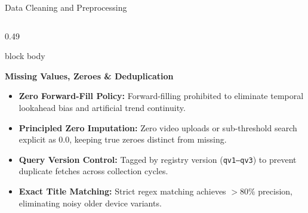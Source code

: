 \documentclass[aspectratio=169, 10pt]{beamer}
\newenvironment{card}[1][]{%
    \begin{beamercolorbox}[rounded=true,shadow=false,wd=\linewidth,sep=4pt,#1]{block body}%
}{%
    \end{beamercolorbox}%
}
\begin{document}
\begin{frame}{Data Cleaning and Preprocessing}
    \begin{columns}[T]
        \begin{column}{0.49\textwidth}
            \begin{card}
                {\fontsize{8.5pt}{10pt}\selectfont \textbf{\color{NavyPrimary}Missing Values, Zeroes \& Deduplication}}\\[0.08cm]
                \begin{itemize}\setlength{\itemsep}{2pt}
                    \item \textbf{Zero Forward-Fill Policy:} Forward-filling prohibited to eliminate temporal lookahead bias and artificial trend continuity.
                    \item \textbf{Principled Zero Imputation:} Zero video uploads or sub-threshold search explicit as 0.0, keeping true zeroes distinct from missing.
                    \item \textbf{Query Version Control:} Tagged by registry version (\texttt{qv1--qv3}) to prevent duplicate fetches across collection cycles.
                    \item \textbf{Exact Title Matching:} Strict regex matching achieves $>80\%$ precision, eliminating noisy older device variants.
                \end{itemize}
            \end{card}
        \end{column}


\end{columns}
\end{frame}
\end{document}

